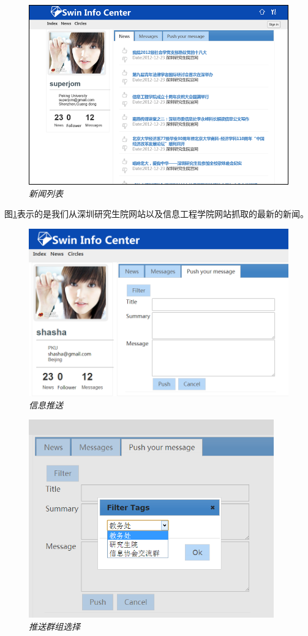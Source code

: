\documentclass[a4paper]{ctexart}
\begin{document}
    \begin{figure}[]
        \centering
        \includegraphics{File6.png}
        \caption{\small \sl 新闻列表}
        \label{fig:news-list}
    \end{figure}
    \par 图\ref{fig:news-list}表示的是我们从深圳研究生院网站以及信息工程学院网站抓取的最新的新闻。
    \begin{figure}[]
        \centering
        \includegraphics[width=400pt]{message.png}
        \caption{\small \sl 信息推送}
        \label{fig:push-message}
    \end{figure}
    \begin{figure}[]
        \centering
        \includegraphics[width=300pt]{filter.png}
        \caption{\small \sl 推送群组选择}
        \label{fig:filter-circle}
    \end{figure}
\end{document}
